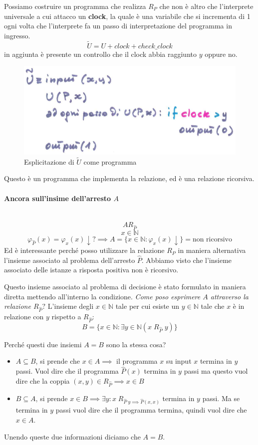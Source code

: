 \documentclass{article}
\begin{document}
Possiamo costruire un programma che realizza $R_P$ che non è altro che l'interprete universale
a cui attacco un \textbf{clock}, la quale è una variabile che si incrementa di 1
ogni volta che l'interprete fa un passo di interpretazione del programma in ingresso.
$$\tilde{U}=U+clock+check\_clock$$
in aggiunta è presente un controllo che il clock abbia raggiunto $y$ oppure no.

\begin{figure}[H]
    \centering
    \includegraphics[scale=0.5]{images/tilde_U.png}
    \caption{Esplicitazione di $\tilde{U}$ come programma}
\end{figure}
Questo è un programma che implementa la relazione, ed è una relazione ricorsiva.

\paragraph{Ancora sull'insime dell'arresto $A$}\mbox{}\\
$$AR_{\hat{P}}$$
$$x\in\mathbb{N}$$
$$\varphi_{\hat{P}}(x)=\varphi_x(x)\downarrow?\implies A=\{x\in\mathbb{N}:\varphi_x(x)\downarrow\}=\text{non ricorsivo}$$
Ed è interessante perché posso utilizzare la relazione $R_P$ in maniera alternativa
l'insieme associato al problema dell'arresto $\hat{P}$. Abbiamo visto che
l'insieme associato delle istanze a risposta positiva non è ricorsivo.

Questo insieme associato al problema di decisione è stato formulato in maniera diretta mettendo
all'interno la condizione. \textit{Come poso esprimere $A$ attraverso
    la relazione $R_{\hat{P}}?$}
L'insieme degli $x\in\mathbb{N}$ tale per cui esiste un $y\in\mathbb{N}$ tale che
$x$ è in relazione con $y$ rispetto a $R_{\hat{P}}$:
$$B=\{x\in\mathbb{N}:\exists y\in\mathbb{N}(x\;R_{\hat{P}}\;y)\}$$

Perché questi due insiemi $A=B$ sono la stessa cosa?
\begin{itemize}
    \item $A\subseteq B$, si prende che $x\in A\implies$ il programma $x$ su input $x$
          termina in $y$ passi. Vuol dire che il programma $\hat{P}(x)$ termina in $y$ passi
          ma questo vuol dire che la coppia $(x,y)\in R_{\hat{P}}\implies x\in B$

    \item $B\subseteq A$, si prende $x\in B\implies\exists y:x\;R_{\hat{P}\;y\implies\hat{P}(x,x)}$
          termina in $y$ passi. Ma se termina in $y$ passi vuol dire che il programma termina, quindi
          vuol dire che $x\in A$.
\end{itemize}
Unendo queste due informazioni diciamo che $A=B$.
\end{document}
